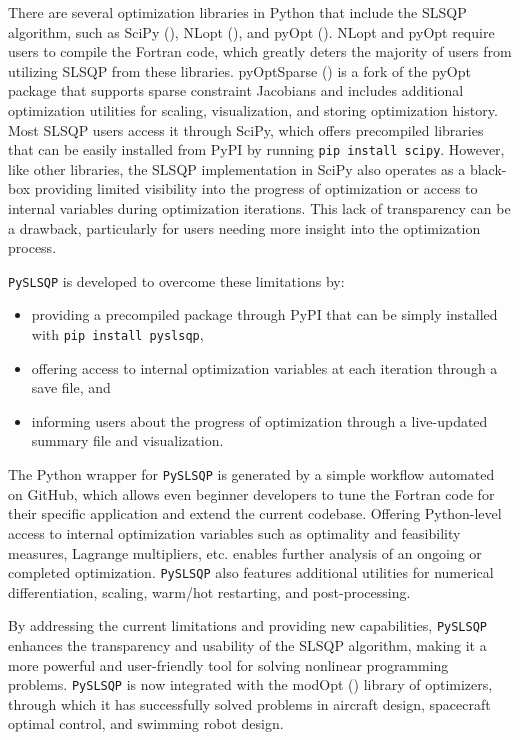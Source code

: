 \documentclass[
]{article}
\begin{document}
There are several optimization libraries in Python that include the
SLSQP algorithm, such as SciPy
(), NLopt
(), and pyOpt
(). NLopt and pyOpt
require users to compile the Fortran code, which greatly deters the
majority of users from utilizing SLSQP from these libraries. pyOptSparse
() is a fork of the
pyOpt package that supports sparse constraint Jacobians and includes
additional optimization utilities for scaling, visualization, and
storing optimization history. Most SLSQP users access it through SciPy,
which offers precompiled libraries that can be easily installed from
PyPI by running \texttt{pip\ install\ scipy}. However, like other
libraries, the SLSQP implementation in SciPy also operates as a
black-box providing limited visibility into the progress of optimization
or access to internal variables during optimization iterations. This
lack of transparency can be a drawback, particularly for users needing
more insight into the optimization process.

\texttt{PySLSQP} is developed to overcome these limitations by:

\begin{itemize}
\item
  providing a precompiled package through PyPI that can be simply
  installed with \texttt{pip\ install\ pyslsqp},
\item
  offering access to internal optimization variables at each iteration
  through a save file, and
\item
  informing users about the progress of optimization through a
  live-updated summary file and visualization.
\end{itemize}

The Python wrapper for \texttt{PySLSQP} is generated by a simple
workflow automated on GitHub, which allows even beginner developers to
tune the Fortran code for their specific application and extend the
current codebase. Offering Python-level access to internal optimization
variables such as optimality and feasibility measures, Lagrange
multipliers, etc. enables further analysis of an ongoing or completed
optimization. \texttt{PySLSQP} also features additional utilities for
numerical differentiation, scaling, warm/hot restarting, and
post-processing.

By addressing the current limitations and providing new capabilities,
\texttt{PySLSQP} enhances the transparency and usability of the SLSQP
algorithm, making it a more powerful and user-friendly tool for solving
nonlinear programming problems. \texttt{PySLSQP} is now integrated with
the modOpt ()
library of optimizers, through which it has successfully solved problems
in aircraft design, spacecraft optimal control, and swimming robot
design.
\end{document}
